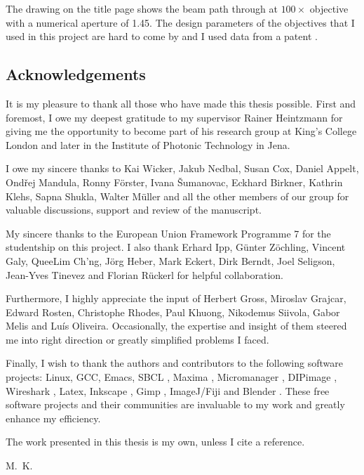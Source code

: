 \documentclass[oneside,a4paper,12pt,BCOR20mm,DIV14]{scrbook} %
\begin{document}
The drawing on the title page shows the beam path through at
$100\times$ objective with a numerical aperture of 1.45. The design
parameters of the objectives that I used in this project are hard to
come by and I used data from a patent \citep{Matthae2003}.


\subsection*{Acknowledgements}
It is my pleasure to thank all those who have made this thesis
possible. First and foremost, I owe my deepest gratitude to my
supervisor Rainer Heintzmann for giving me the opportunity to become
part of his research group at King's College London and later in the
Institute of Photonic Technology in Jena.

I owe my sincere thanks to Kai Wicker, Jakub Nedbal, Susan Cox, Daniel
Appelt, Ond\v rej Mandula, Ronny F\"orster, Ivana \v Sumanovac,
Eckhard Birkner, Kathrin Klehs, Sapna Shukla, Walter M\"uller and all
the other members of our group for valuable discussions, support and
review of the manuscript.

My sincere thanks to the European Union Framework Programme 7 for the
studentship on this project.  I also thank Erhard Ipp, G\"unter
Z\"ochling, Vincent Galy, QueeLim Ch'ng, J\"org Heber, Mark Eckert,
Dirk Berndt, Joel Seligson, Jean-Yves Tinevez and Florian R\"uckerl
for helpful collaboration.

Furthermore, I highly appreciate the input of Herbert Gross, Miroslav
Grajcar, Edward Rosten, Christophe Rhodes, Paul Khuong, Nikodemus
Siivola, Gabor Melis and Lu\' is Oliveira. Occasionally, the expertise
and insight of them steered me into right direction or greatly
simplified problems I faced.

Finally, I wish to thank the authors and contributors to the following
software projects: Linux, GCC, Emacs, SBCL \citep{Rhodes2008}, Maxima
\citep{Maxima.sourceforge.net2013}, Micromanager
\citep{Edelstein2010}, DIPimage \citep{dipimage}, Wireshark
\citep{wireshark}, Latex, Inkscape \citep{inkscape}, Gimp
\citep{gimp}, ImageJ/Fiji \citep{Abramoff,Schindelin2012} and Blender
\cite{blender}.  These free software projects and their communities
are invaluable to my work and greatly enhance my efficiency.

The work presented in this thesis is my own, unless I cite a
reference.

\begin{flushright}
  M.~K.
\end{flushright}
\end{document}
